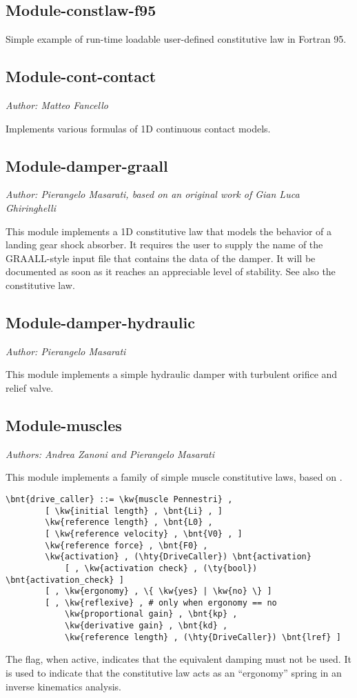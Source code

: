 \subsection{Module-constlaw-f95}
Simple example of run-time loadable user-defined constitutive law in Fortran 95.

\subsection{Module-cont-contact}
\emph{Author: Matteo Fancello}

\noindent
Implements various formulas of 1D continuous contact models.

\subsection{Module-damper-graall}
\emph{Author: Pierangelo Masarati, based on an original work of Gian Luca Ghiringhelli}

This module implements a 1D constitutive law that models
the behavior of a landing gear shock absorber.
It requires the user to supply the name of the GRAALL-style 
input file that contains the data of the damper.
It will be documented as soon as it reaches an appreciable level
of stability.
See also the 
constitutive law.

\subsection{Module-damper-hydraulic}
\emph{Author: Pierangelo Masarati}

\noindent
This module implements a simple hydraulic damper with turbulent orifice and relief valve.

\subsection{Module-muscles}
\emph{Authors: Andrea Zanoni and Pierangelo Masarati}

\bigskip

\noindent
This module implements a family of simple muscle constitutive laws,
based on \cite{PENNESTRI-2007-JB}.
\begin{Verbatim}[commandchars=\\\{\}]
    \bnt{drive_caller} ::= \kw{muscle Pennestri} ,
        [ \kw{initial length} , \bnt{Li} , ]
        \kw{reference length} , \bnt{L0} ,
        [ \kw{reference velocity} , \bnt{V0} , ]
        \kw{reference force} , \bnt{F0} ,
        \kw{activation} , (\hty{DriveCaller}) \bnt{activation}
            [ , \kw{activation check} , (\ty{bool}) \bnt{activation_check} ]
        [ , \kw{ergonomy} , \{ \kw{yes} | \kw{no} \} ]
        [ , \kw{reflexive} , # only when ergonomy == no
            \kw{proportional gain} , \bnt{kp} ,
            \kw{derivative gain} , \bnt{kd} ,
            \kw{reference length} , (\hty{DriveCaller}) \bnt{lref} ]
\end{Verbatim}
The  flag, when active, indicates that the equivalent damping
must not be used.
It is used to indicate that the constitutive law acts as an ``ergonomy''
spring in an inverse kinematics analysis.

